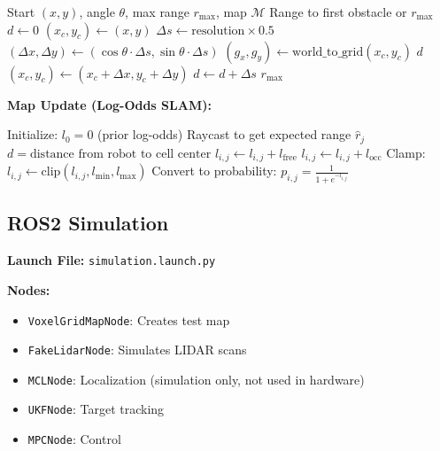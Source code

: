 \documentclass[11pt]{article}
\begin{document}
\begin{algorithm}[H]
\caption{Raycast in Occupancy Grid}
\begin{algorithmic}[1]
\Require Start $(x, y)$, angle $\theta$, max range $r_{\max}$, map $\mathcal{M}$
\Ensure Range to first obstacle or $r_{\max}$
\State $d \gets 0$
\State $(x_c, y_c) \gets (x, y)$
\State $\Delta s \gets \text{resolution} \times 0.5$
\State $(\Delta x, \Delta y) \gets (\cos\theta \cdot \Delta s, \sin\theta \cdot \Delta s)$
    \State $(g_x, g_y) \gets \text{world\_to\_grid}(x_c, y_c)$
        \Return $d$
    \EndIf
    \State $(x_c, y_c) \gets (x_c + \Delta x, y_c + \Delta y)$
    \State $d \gets d + \Delta s$
\EndWhile
\Return $r_{\max}$
\end{algorithmic}
\end{algorithm}

\textbf{Map Update (Log-Odds SLAM):}

\begin{algorithm}[H]
\caption{Log-Odds Occupancy Grid Update}
\begin{algorithmic}[1]
\State Initialize: $l_0 = 0$ (prior log-odds)
    \State Raycast to get expected range $\hat{r}_j$
        \State $d = \text{distance from robot to cell center}$
            \State $l_{i,j} \gets l_{i,j} + l_{\text{free}}$ 
            \State $l_{i,j} \gets l_{i,j} + l_{\text{occ}}$ 
        \EndIf
        \State Clamp: $l_{i,j} \gets \text{clip}(l_{i,j}, l_{\min}, l_{\max})$
    \EndFor
\EndFor
\State Convert to probability: $p_{i,j} = \frac{1}{1 + e^{-l_{i,j}}}$
\end{algorithmic}
\end{algorithm}

\subsection{ROS2 Simulation}

\textbf{Launch File:} \texttt{simulation.launch.py}

\textbf{Nodes:}
\begin{itemize}
    \item \texttt{VoxelGridMapNode}: Creates test map
    \item \texttt{FakeLidarNode}: Simulates LIDAR scans
    \item \texttt{MCLNode}: Localization (simulation only, not used in hardware)
    \item \texttt{UKFNode}: Target tracking
    \item \texttt{MPCNode}: Control
\end{itemize}
\end{document}
